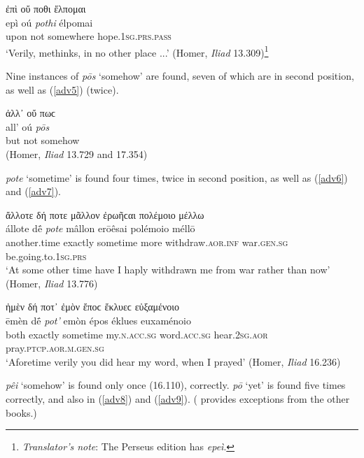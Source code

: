 \begin{exe}
\ex ἐπὶ οὔ ποθι ἔλπομαι\\
\gll epì oú \emph{pothi} élpomai\\
upon not somewhere hope.\textsc{1sg.prs.pass}\\
\trans `Verily, methinks, in no other place ...' (Homer, \textit{Iliad} 13.309)\footnote{\emph{Translator's note}: The Perseus edition has \textit{epeì}.}
\label{adv4}
\end{exe}

Nine instances of \textit{pōs} `somehow' are found, seven of which are in second position, as well as (\ref{adv5}) (twice).

\begin{exe}
\ex ἀλλ᾽ οὔ πωϲ\\
\gll all' oú \emph{pōs}\\
but not somehow\\ 
\trans (Homer, \textit{Iliad} 13.729 and 17.354)
\label{adv5}
\end{exe}

\textit{pote} `sometime' is found four times, twice in second position, as well as (\ref{adv6}) and (\ref{adv7}).

\begin{exe}
\ex ἄλλοτε δή ποτε μᾶλλον ἐρωῆϲαι πολέμοιο μέλλω\\
\gll állote dḗ \emph{pote} mâllon erōêsai polémoio méllō\\
another.time exactly sometime more withdraw.\textsc{aor.inf}
war.\textsc{gen.sg} be.going.to.\textsc{1sg.prs}\\
\trans `At some other time have I haply withdrawn me from war rather than now' (Homer, \textit{Iliad} 13.776)
\label{adv6}
\end{exe}

\begin{exe}
\ex ἠμὲν δή ποτ᾽ ἐμὸν ἔποϲ ἔκλυεϲ εὐξαμένοιο\\
\gll ēmèn dḗ \emph{pot'} emòn épos éklues euxaménoio\\
both exactly sometime my.\textsc{n.acc.sg} word.\textsc{acc.sg}
hear.\textsc{2sg.aor} pray.\textsc{ptcp.aor.m.gen.sg}\\
\trans `Aforetime verily you did hear my word, when I prayed' (Homer, \textit{Iliad} 16.236)
\label{adv7}
\end{exe}

\textit{pêi} `somehow' is found only once (16.110), correctly. \textit{pō} `yet' is found five times correctly, and also in (\ref{adv8}) and (\ref{adv9}). (\citealp[336ff.]{Monro1891} provides exceptions from the other books.)


